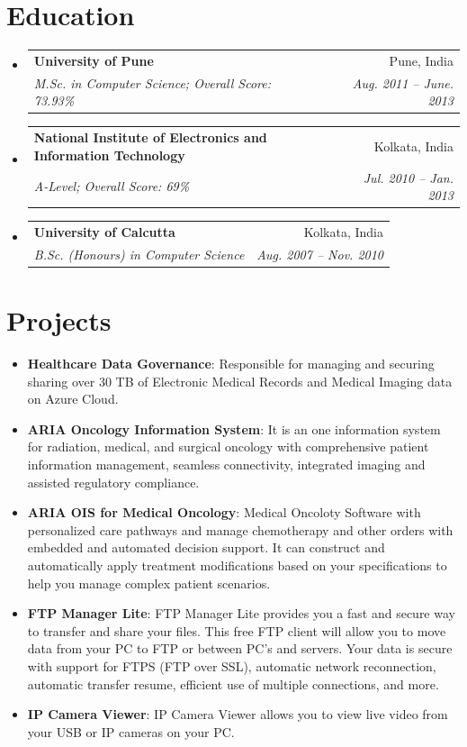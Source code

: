 \documentclass[letterpaper,11pt]{article}
\makeatletter
\newcommand{\resumeItem}[2]{
  \item\small{ 
    \textbf{ #1}{: #2 \vspace{-2pt}}
  }
}
\newcommand{\resumeSubheading}[4]{
  \vspace{-1pt}\item
    \begin{tabular*}{0.97\textwidth}[t]{l@{\extracolsep{\fill}}r}
      \textbf{#1} & #2 \\
      \textit{\small#3} & \textit{\small #4} \\
    \end{tabular*}\vspace{-5pt}
}
\newcommand{\resumeSubItem}[2]{\resumeItem{#1}{#2}\vspace{-4pt}}
\newcommand{\resumeSubHeadingListStart}{\begin{itemize}[leftmargin=*]}
\newcommand{\resumeSubHeadingListEnd}{\end{itemize}}
\makeatother
\begin{document}
\section{Education}
  \resumeSubHeadingListStart
    \resumeSubheading
      {University of Pune}{Pune, India}
      {M.Sc. in Computer Science;  Overall Score: 73.93\%}{Aug. 2011 -- June. 2013}
    \resumeSubheading
      {National Institute of Electronics and Information Technology}{Kolkata, India}
      {A-Level;  Overall Score: 69\% }{Jul. 2010 -- Jan. 2013}
    \resumeSubheading
      {University of Calcutta}{Kolkata, India}
      {B.Sc. (Honours) in Computer Science}{Aug. 2007 -- Nov. 2010}
  \resumeSubHeadingListEnd


\section{Projects}
  \resumeSubHeadingListStart
    \resumeSubItem{Healthcare Data Governance}
      {Responsible for managing and securing sharing over 30 TB of Electronic Medical Records and Medical Imaging data on Azure Cloud.}
    \resumeSubItem{ARIA Oncology Information System}
      {It is an one information system for radiation, medical, and surgical oncology with comprehensive patient information management, seamless connectivity, integrated imaging and assisted regulatory compliance.}
    \resumeSubItem{ARIA OIS for Medical Oncology}
      {Medical Oncoloty Software with personalized care pathways and manage chemotherapy and other orders with embedded and automated decision support. It can construct and automatically apply treatment modifications based on your specifications to help you manage complex patient scenarios.}
    \resumeSubItem{FTP Manager Lite}
      {FTP Manager Lite provides you a fast and secure way to transfer and share your files.  This free FTP client will allow you to move data from your PC to FTP or between PC's and servers.  Your data is secure with support for FTPS (FTP over SSL), automatic network reconnection, automatic transfer resume, efficient use of multiple connections, and more.}
    \resumeSubItem{IP Camera Viewer}
      {IP Camera Viewer allows you to view live video from your USB or IP cameras on your PC.}
  \resumeSubHeadingListEnd


\end{document}
